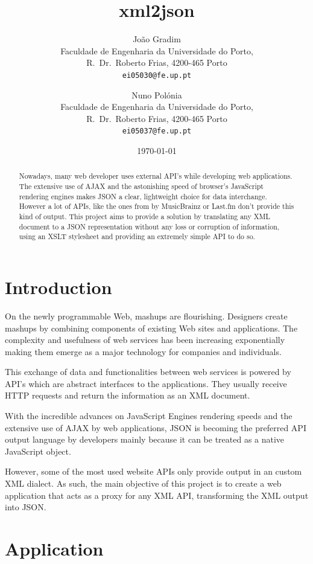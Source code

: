 \documentclass[twocolumn,twoside,10pt,a4paper]{article}
\title{xml2json}
\author{João Gradim\\
\small Faculdade de Engenharia da Universidade do Porto,\\[-0.8ex]
\small R.\ Dr.\ Roberto Frias, 4200-465 Porto\\[-0.8ex]
\small \texttt{ei05030@fe.up.pt}\\
\and
Nuno Polónia\\
\small Faculdade de Engenharia da Universidade do Porto,\\[-0.8ex]
\small R.\ Dr.\ Roberto Frias, 4200-465 Porto\\[-0.8ex]
\small \texttt{ei05037@fe.up.pt}
}
\date{\today}
\begin{document}
\maketitle
\thispagestyle{plain}

\begin{abstract}
Nowadays, many web developer uses external API's while developing web applications. The extensive use of AJAX and the astonishing speed of browser's JavaScript rendering engines makes JSON a clear, lightweight choice for data interchange. However a lot of APIs, like the ones from by MusicBrainz or Last.fm don't provide this kind of output. This project aims to provide a solution by translating any XML document to a JSON representation without any loss or corruption of information, using an XSLT stylesheet and providing an extremely simple API to do so.
\end{abstract}

\section{Introduction}\label{sec:intro}

On the newly programmable Web, mashups are flourishing. Designers create mashups by combining components of existing Web sites and applications\cite{maximilien}. The complexity and usefulness of web services has been increasing exponentially making them emerge as a major technology for companies and individuals\cite{benslimane}.

This exchange of data and functionalities between web services is powered by API's which are abstract interfaces to the applications. They usually receive HTTP requests and return the information as an XML document.

With the incredible advances on JavaScript Engines rendering speeds and the extensive use of AJAX by web applications, JSON is becoming the preferred API output language by developers mainly because it can be treated as a native JavaScript object.

However, some of the most used website APIs only provide output in an custom XML dialect. As such, the main objective of this project is to create a web application that acts as a proxy for any XML API, transforming the XML output into JSON.

\section{Application}\label{sec:application}
\end{document}

